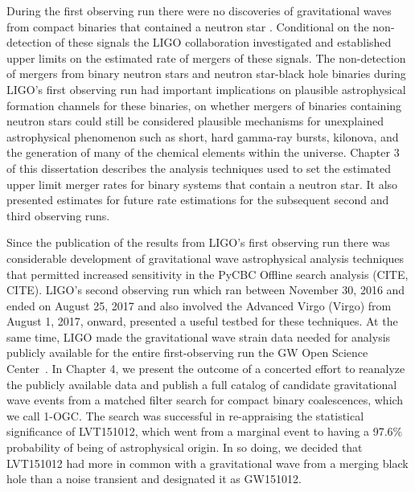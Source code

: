 During the first observing run there were no discoveries of gravitational waves from compact binaries that contained a neutron star \cite{O1BBH}. Conditional on the non-detection of these signals the LIGO collaboration investigated and established upper limits on the estimated rate of mergers of these signals. The non-detection of mergers from binary neutron stars and neutron star-black hole binaries during LIGO's first observing run had important implications on plausible astrophysical formation channels for these binaries, on whether mergers of binaries containing neutron stars could still be considered plausible mechanisms for unexplained astrophysical phenomenon such as short, hard gamma-ray bursts, kilonova, and the generation of many of the chemical elements within the universe. Chapter 3 of this dissertation describes the analysis techniques used to set the estimated upper limit merger rates for binary systems that contain a neutron star. It also presented estimates for future rate estimations for the subsequent second and third observing runs.

Since the publication of the results from LIGO's first observing run there was considerable development of gravitational wave astrophysical analysis techniques that permitted increased sensitivity in the PyCBC Offline search analysis (CITE, CITE). LIGO's second observing run which ran between November 30, 2016 and ended on August 25, 2017 and also involved the Advanced Virgo (Virgo) from August 1, 2017, onward, presented a useful testbed for these techniques. At the same time, LIGO made the gravitational wave strain data needed for analysis publicly available for the entire first-observing run the GW Open Science Center~\citep{Vallisneri:2014vxa,gw170817-losc}. In Chapter 4, we present the outcome of a concerted effort to reanalyze the publicly available data and publish a full catalog of candidate gravitational wave events from a matched filter search for compact binary coalescences, which we call 1-OGC. The search was successful in re-appraising the statistical significance of LVT151012, which went from a marginal event to having a 97.6$\%$ probability of being of astrophysical origin. In so doing, we decided that LVT151012 had more in common with a gravitational wave from a merging black hole than a noise transient and designated it as GW151012.

